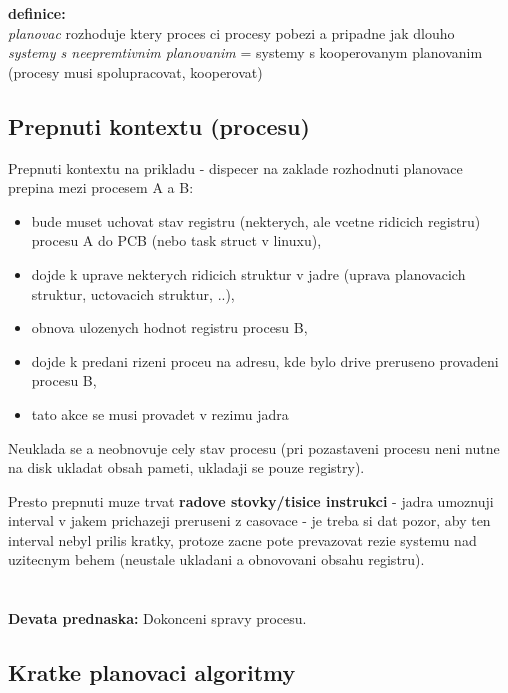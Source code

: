 \documentclass[a4paper, 11pt]{article}
\begin{document}
\textbf{definice:} \\[0.5em]
\textit{planovac} rozhoduje ktery proces ci procesy pobezi a pripadne jak dlouho \\[0.2em]
\textit{systemy s neepremtivnim planovanim} = systemy s kooperovanym planovanim (procesy musi spolupracovat, kooperovat) \\

\subsection{Prepnuti kontextu (procesu)}
Prepnuti kontextu na prikladu - dispecer na zaklade rozhodnuti planovace prepina mezi procesem A a B:
\begin{itemize}
    \item bude muset uchovat stav registru (nekterych, ale vcetne ridicich registru) procesu A do PCB (nebo task struct v linuxu),
    \item dojde k uprave nekterych ridicich struktur v jadre (uprava planovacich struktur, uctovacich struktur, ..),
    \item obnova ulozenych hodnot registru procesu B,
    \item dojde k predani rizeni proceu na adresu, kde bylo drive preruseno provadeni procesu B,
    \item tato akce se musi provadet v rezimu jadra \\
\end{itemize}

Neuklada se a neobnovuje cely stav procesu (pri pozastaveni procesu neni nutne na disk ukladat obsah pameti, ukladaji se pouze registry).

Presto prepnuti muze trvat \textbf{radove stovky/tisice instrukci} - jadra umoznuji interval v jakem prichazeji preruseni z casovace - je treba si dat pozor, aby ten interval nebyl prilis kratky, protoze zacne pote prevazovat rezie systemu nad uzitecnym behem (neustale ukladani a obnovovani obsahu registru).

\newpage

\section{}
\textbf{Devata prednaska:} Dokonceni spravy procesu.

\subsection{Kratke planovaci algoritmy}
\end{document}

